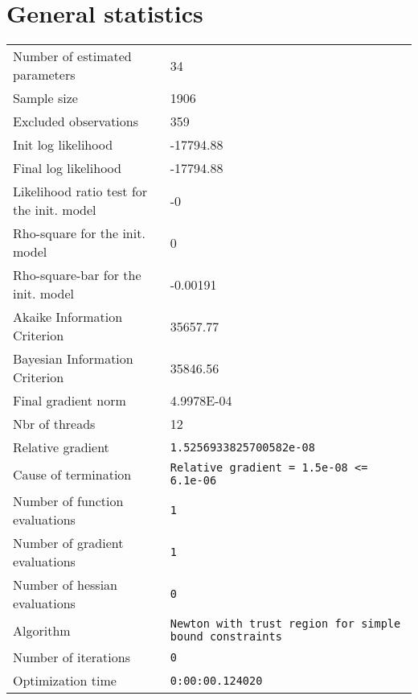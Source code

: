 



\section{General statistics}
\begin{tabular}{ll}
Number of estimated parameters & 34 \\
Sample size & 1906 \\
Excluded observations & 359 \\
Init log likelihood & -17794.88 \\
Final log likelihood & -17794.88 \\
Likelihood ratio test for the init. model & -0 \\
Rho-square for the init. model & 0 \\
Rho-square-bar for the init. model & -0.00191 \\
Akaike Information Criterion & 35657.77 \\
Bayesian Information Criterion & 35846.56 \\
Final gradient norm & 4.9978E-04 \\
Nbr of threads & 12 \\
Relative gradient & \verb$1.5256933825700582e-08$ \\
Cause of termination & \verb$Relative gradient = 1.5e-08 <= 6.1e-06$ \\
Number of function evaluations & \verb$1$ \\
Number of gradient evaluations & \verb$1$ \\
Number of hessian evaluations & \verb$0$ \\
Algorithm & \verb$Newton with trust region for simple bound constraints$ \\
Number of iterations & \verb$0$ \\
Optimization time & \verb$0:00:00.124020$ \\
\end{tabular}

